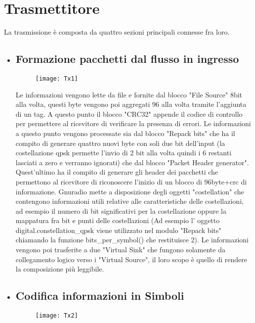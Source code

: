  \section{Trasmettitore}
 La trasmissione è composta da quattro sezioni principali connesse fra loro.
 \begin{itemize}
 	\item \subsection{Formazione pacchetti dal flusso in ingresso}
 	\begin{figure}[h]
 		\centering
 		\texttt{[image: Tx1]}
 		\caption{}
 	\end{figure}
 Le informazioni vengono lette da file e fornite dal blocco "File Source" 8bit alla volta, questi byte vengono poi aggregati 96 alla volta tramite l'aggiunta di un tag. A questo punto il blocco "CRC32" appende il codice di controllo per permettere al ricevitore di verificare la presenza di errori. Le informazioni a questo punto vengono processate sia dal blocco "Repack bits" che ha il compito di generare quattro nuovi byte con soli due bit dell'input (la costellazione qpsk permette l'invio di 2 bit alla volta quindi i 6 restanti lasciati a zero e verranno ignorati) che dal blocco "Packet Header generator". Quest'ultimo ha il compito di generare gli header dei pacchetti che permettono al ricevitore di riconoscere l'inizio di un blocco di 96byte+crc di informazione. Gnuradio mette a disposizione degli oggetti "costellation" che contengono informazioni utili relative alle caratteristiche delle costellazioni, ad esempio il numero di bit significativi per la costellazione oppure la mappatura fra bit e punti delle costellazioni (Ad esempio l' oggetto digital.constellation\_qpsk viene utilizzato nel modulo "Repack bits" chiamando la funzione bits\_per\_symbol() che restituisce 2). Le informazioni vengono poi trasferite a due "Virtual Sink" che fungono solamente da collegamento logico verso i "Virtual Source", il loro scopo è quello di rendere la composizione più leggibile.
 	\item \subsection{Codifica informazioni in Simboli}
 	\begin{figure}[h]
 		\centering
 		\texttt{[image: Tx2]}
 		\caption{}
 	\end{figure}

\end{itemize}
